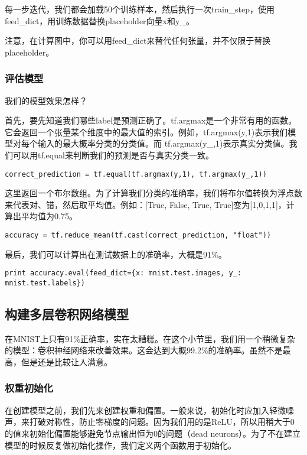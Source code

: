 每一步迭代，我们都会加载50个训练样本，然后执行一次train\_step，使用feed\_dict，用训练数据替换placeholder向量x和y\_。

注意，在计算图中，你可以用feed\_dict来替代任何张量，并不仅限于替换placeholder。

\subsubsection{评估模型}

我们的模型效果怎样？

首先，要先知道我们哪些label是预测正确了。tf.argmax是一个非常有用的函数。它会返回一个张量某个维度中的最大值的索引。例如，tf.argmax(y,1)表示我们模型对每个输入的最大概率分类的分类值。而 tf.argmax(y\_,1)表示真实分类值。我们可以用tf.equal来判断我们的预测是否与真实分类一致。

\begin{lstlisting}
correct_prediction = tf.equal(tf.argmax(y,1), tf.argmax(y_,1))
\end{lstlisting}

这里返回一个布尔数组。为了计算我们分类的准确率，我们将布尔值转换为浮点数来代表对、错，然后取平均值。例如：[True, False, True, True]变为[1,0,1,1]，计算出平均值为0.75。

\begin{lstlisting}
accuracy = tf.reduce_mean(tf.cast(correct_prediction, "float"))
\end{lstlisting}

最后，我们可以计算出在测试数据上的准确率，大概是91\%。

\begin{lstlisting}
print accuracy.eval(feed_dict={x: mnist.test.images, y_: mnist.test.labels})
\end{lstlisting}

\subsection{构建多层卷积网络模型}

在MNIST上只有91\%正确率，实在太糟糕。在这个小节里，我们用一个稍微复杂的模型：卷积神经网络来改善效果。这会达到大概99.2\%的准确率。虽然不是最高，但是还是比较让人满意。

\subsubsection{权重初始化}

在创建模型之前，我们先来创建权重和偏置。一般来说，初始化时应加入轻微噪声，来打破对称性，防止零梯度的问题。因为我们用的是ReLU，所以用稍大于0的值来初始化偏置能够避免节点输出恒为0的问题（dead neurons）。为了不在建立模型的时候反复做初始化操作，我们定义两个函数用于初始化。

